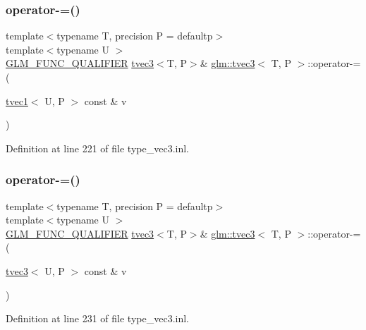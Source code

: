 \subsubsection{\texorpdfstring{operator-\/=()}{operator-=()}\hspace{0.1cm}{\footnotesize\ttfamily [5/6]}}
{\footnotesize\ttfamily template$<$typename T, precision P = defaultp$>$ \\
template$<$typename U $>$ \\
\mbox{\hyperlink{setup_8hpp_a33fdea6f91c5f834105f7415e2a64407}{G\+L\+M\+\_\+\+F\+U\+N\+C\+\_\+\+Q\+U\+A\+L\+I\+F\+I\+ER}} \mbox{\hyperlink{structglm_1_1tvec3}{tvec3}}$<$T, P$>$\& \mbox{\hyperlink{structglm_1_1tvec3}{glm\+::tvec3}}$<$ T, P $>$\+::operator-\/= (\begin{DoxyParamCaption}\item[{\mbox{\hyperlink{structglm_1_1tvec1}{tvec1}}$<$ U, P $>$ const \&}]{v }\end{DoxyParamCaption})}



Definition at line 221 of file type\+\_\+vec3.\+inl.

\mbox{\label{structglm_1_1tvec3_acec58495abe12a054d93d709f629f3c1}} 
\subsubsection{\texorpdfstring{operator-\/=()}{operator-=()}\hspace{0.1cm}{\footnotesize\ttfamily [6/6]}}
{\footnotesize\ttfamily template$<$typename T, precision P = defaultp$>$ \\
template$<$typename U $>$ \\
\mbox{\hyperlink{setup_8hpp_a33fdea6f91c5f834105f7415e2a64407}{G\+L\+M\+\_\+\+F\+U\+N\+C\+\_\+\+Q\+U\+A\+L\+I\+F\+I\+ER}} \mbox{\hyperlink{structglm_1_1tvec3}{tvec3}}$<$T, P$>$\& \mbox{\hyperlink{structglm_1_1tvec3}{glm\+::tvec3}}$<$ T, P $>$\+::operator-\/= (\begin{DoxyParamCaption}\item[{\mbox{\hyperlink{structglm_1_1tvec3}{tvec3}}$<$ U, P $>$ const \&}]{v }\end{DoxyParamCaption})}



Definition at line 231 of file type\+\_\+vec3.\+inl.

